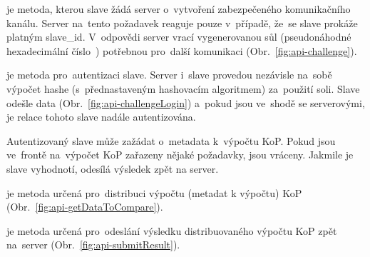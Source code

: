 
je metoda, kterou slave žádá server o~vytvoření zabezpečeného komunikačního kanálu. Server na~tento požadavek reaguje pouze v~případě, že~se slave prokáže platným slave\_id. V~odpovědi server vrací vygenerovanou sůl (pseudonáhodné hexadecimální číslo~\cite{hash}) potřebnou pro~další komunikaci (Obr.~\ref{fig:api-challenge}).


 je metoda pro~autentizaci slave. Server i~slave provedou nezávisle na~sobě výpočet hashe (s~přednastaveným hashovacím algoritmem) za~použití soli. Slave odešle data (Obr.~\ref{fig:api-challengeLogin}) a~pokud jsou ve~shodě se serverovými, je relace tohoto slave nadále autentizována.


Autentizovaný slave může zažádat o~metadata k~výpočtu KoP. Pokud jsou ve~frontě na~výpočet KoP zařazeny nějaké požadavky, jsou vráceny. Jakmile je slave vyhodnotí, odesílá výsledek zpět na server.

je metoda určená pro~distribuci výpočtu (metadat k výpočtu) KoP (Obr.~\ref{fig:api-getDataToCompare}).


je metoda určená pro~odeslání výsledku distribuovaného výpočtu KoP zpět na~server (Obr.~\ref{fig:api-submitResult}).





%


